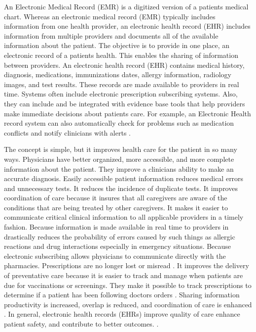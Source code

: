 \documentclass[sigconf]{acmart}
\begin{document}
An Electronic Medical Record (EMR) is a digitized version of a patients medical chart.  Whereas an electronic medical record (EMR) typically includes information from one health provider, an electronic health record (EHR) includes information from multiple providers and documents all of the available information about the patient.  The objective is to provide in one place, an electronic record of a patients health. This enables the sharing of information between providers. An electronic health record (EHR) contains medical history, diagnosis, medications, immunizations dates, allergy information, radiology images, and test results. These records are made available to providers in real time.  Systems often include electronic prescription subscribing systems. Also, they can include and be integrated with evidence base tools that help providers make immediate decisions about patients care. For example, an Electronic Health record system can also automatically check for problems such as medication conflicts and notify clinicians with alerts \cite{www-google-elec}.


The concept is simple, but it improves health care for the patient in so many ways. Physicians have better organized, more accessible, and more complete information about the patient.  They improve a clinicians ability to make an accurate diagnosis.  Easily accessible patient information reduces medical errors and unnecessary tests. It reduces the incidence of duplicate tests. It improves coordination of care because it insures that all caregivers are aware of the conditions that are being treated by other caregivers. It makes it easier to communicate critical clinical information to all applicable providers in a timely fashion. Because information is made available in real time to providers in drastically reduces the probability of errors caused by such things as allergic reactions and drug interactions especially in emergency situations.  Because electronic subscribing allows physicians to communicate directly with the pharmacies. Prescriptions are no longer lost or misread \cite{www-google-elec}.  It improves the delivery of preventative care because it is easier to track and manage when patients are due for vaccinations or screenings. They make it possible to track prescriptions to determine if a patient has been following doctors orders \cite{www-google-datapine}.  Sharing information productivity is increased, overlap is reduced, and coordination of care is enhanced \cite {www-google-christian}. In general, electronic health records (EHRs) improve quality of care enhance patient safety, and contribute to better outcomes. \cite{www-google-elec}.
\end{document}

